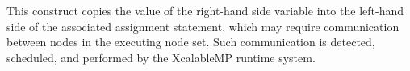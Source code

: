 This construct copies the value of the right-hand side variable into
the left-hand side of the associated assignment statement, which may
require communication between nodes in the executing node set. Such
communication is detected, scheduled, and performed by the XcalableMP
runtime system.



%
%
%
%


